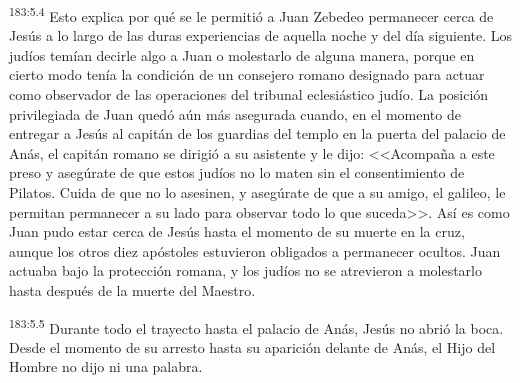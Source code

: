 \par 
\textsuperscript{183:5.4} Esto explica por qué se le permitió a Juan Zebedeo permanecer cerca de Jesús a lo largo de las duras experiencias de aquella noche y del día siguiente. Los judíos temían decirle algo a Juan o molestarlo de alguna manera, porque en cierto modo tenía la condición de un consejero romano designado para actuar como observador de las operaciones del tribunal eclesiástico judío. La posición privilegiada de Juan quedó aún más asegurada cuando, en el momento de entregar a Jesús al capitán de los guardias del templo en la puerta del palacio de Anás, el capitán romano se dirigió a su asistente y le dijo: <<Acompaña a este preso y asegúrate de que estos judíos no lo maten sin el consentimiento de Pilatos. Cuida de que no lo asesinen, y asegúrate de que a su amigo, el galileo, le permitan permanecer a su lado para observar todo lo que suceda>>. Así es como Juan pudo estar cerca de Jesús hasta el momento de su muerte en la cruz, aunque los otros diez apóstoles estuvieron obligados a permanecer ocultos. Juan actuaba bajo la protección romana, y los judíos no se atrevieron a molestarlo hasta después de la muerte del Maestro.

\par 
\textsuperscript{183:5.5} Durante todo el trayecto hasta el palacio de Anás, Jesús no abrió la boca. Desde el momento de su arresto hasta su aparición delante de Anás, el Hijo del Hombre no dijo ni una palabra.